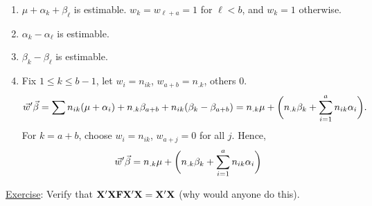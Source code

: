 \begin{enumerate}[(1)]
    \item $ \mu+\alpha_k+\beta_\ell $ is estimable. $ w_k=w_{\ell+a}=1 $ for $ \ell<b $, and $ w_k=1 $ otherwise.
    \item $ \alpha_k-\alpha_\ell $ is estimable.
    \item $ \beta_k-\beta_\ell $ is estimable.
    \item Fix $ 1\le k\le b-1 $, let $ w_i=n_{ik} $, $ w_{a+b}=n_{.k} $, others $ 0 $.
          \[ \vec{w}'\vec{\beta}=\sum n_{ik}(\mu+\alpha_i)+n_{.k}\beta_{a+b}+n_{ik}(\beta_k-\beta_{a+b})=n_{.k}\mu+\biggl(n_{.k}\beta_k+\sum_{i=1}^{a}n_{ik}\alpha_i\biggr). \]
          For $ k=a+b $, choose $ w_i=n_{ik} $, $ w_{a+j}=0 $ for all $ j $. Hence,
          \[ \vec{w}'\vec{\beta}=n_{.k}\mu+\biggl(n_{.k}\beta_k+\sum_{i=1}^{a}n_{ik}\alpha_i\biggr) \]
\end{enumerate}
\underline{Exercise}: Verify that $ \mathbf{X}'\mathbf{X}\mathbf{F}\mathbf{X}'\mathbf{X}=\mathbf{X}'\mathbf{X} $ (why would anyone do this).